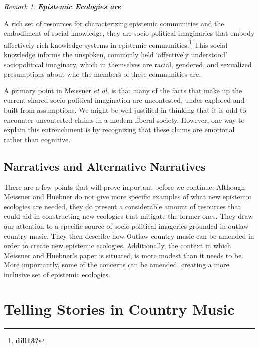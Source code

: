 \documentclass[
  12pt,
]{book}
\theoremstyle{definition}
\theoremstyle{definition}
\theoremstyle{definition}
\theoremstyle{definition}
\theoremstyle{remark}
\newtheorem*{remark}{Remark}
\begin{document}
\begin{remark}
\textbf{\emph{Epistemic Ecologies are}}

A rich set of resources for characterizing epistemic communities and the embodiment of social knowledge, they are socio-political imaginaries that embody affectively rich knowledge systems in epistemic communities.\footnote{\textbf{dill13?}} This social knowledge informs the unspoken, commonly held `affectively understood' sociopolitical imaginary, which in themselves are racial, gendered, and sexualized presumptions about who the members of these communities are.
\end{remark}

A primary point in Meissner \emph{et al}, is that many of the facts that make up the current shared socio-political imagination are uncontested, under explored and built from assumptions. We might be well justified in thinking that it is odd to encounter uncontested claims in a modern liberal society. However, one way to explain this entrenchment is by recognizing that these claims are emotional rather than cognitive.

\subsection{Narratives and Alternative Narratives}\label{narratives-and-alternative-narratives}

There are a few points that will prove important before we continue. Although Meissner and Huebner do not give more specific examples of what new epistemic ecologies are needed, they do present a considerable amount of resources that could aid in constructing new ecologies that mitigate the former ones. They draw our attention to a specific source of socio-political imageries grounded in outlaw country music. They then describe how Outlaw country music can be amended in order to create new epistemic ecologies. Additionally, the context in which Meissner and Huebner's paper is situated, is more modest than it needs to be. More importantly, some of the concerns can be amended, creating a more inclusive set of epistemic ecologies.

\section{Telling Stories in Country Music}\label{telling-stories-in-country-music}
\end{document}
